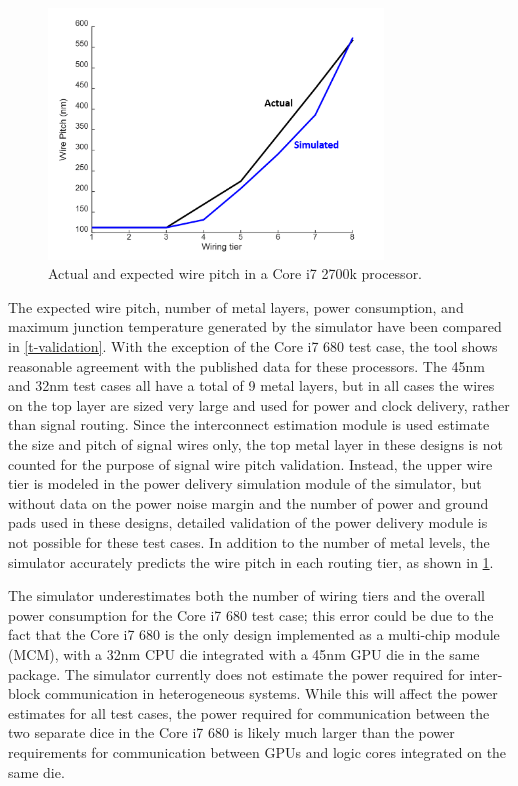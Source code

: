 \documentclass[journal,twoside]{IEEEtran}
\newcommand{\changed}[1]{\textcolor{red}{#1}}
\renewcommand{\changed}[1]{#1} %
\begin{document}
\begin{figure}[tb]
	\centering
	\includegraphics[width=3.5in]{Figures/sb_wire_pitch_2.png}
	\caption{
		Actual and expected wire pitch in a Core i7 2700k processor.
	}
	\label{f-sb-wire-pitch}
\end{figure}


The expected wire pitch, number of metal layers, power consumption, and
maximum junction temperature generated by the simulator have been compared in \cref{t-validation}. 
\changed{With the exception of the Core i7 680 test case, the tool shows reasonable agreement with the
published data for these processors. The 45nm and 32nm test cases all have a total of 9 metal layers, but in all cases
the wires on the top layer are sized very large and used for power and clock delivery, rather than signal routing.
Since the interconnect estimation
module is used estimate the size and pitch of signal wires only, the top metal layer in these designs is not counted
for the purpose of signal wire pitch validation. Instead, the upper wire tier is modeled in the power delivery simulation
module of the simulator, but without data on the
power noise margin and the number of power and ground pads used in these designs, detailed validation of the power
delivery module is not possible for these test cases.
In addition to the number of metal levels, the simulator accurately predicts
the wire pitch in each routing tier, as shown in \cref{f-sb-wire-pitch}.}



\changed{The simulator underestimates both the number of wiring tiers
and the overall power consumption for the Core i7 680 test case; this error could be due to the fact that the
Core i7 680 is the only design implemented as a multi-chip module (MCM), with a 32nm CPU die 
integrated with a 45nm GPU die in the same package.}
\changed{The simulator currently does not estimate the power required for inter-block communication in
heterogeneous systems. While this will affect the power estimates for all test cases, 
the power required for communication between the two
separate dice in the Core i7 680 is likely much larger than the power requirements for communication between GPUs and logic cores
integrated on the same die.}
\end{document}
